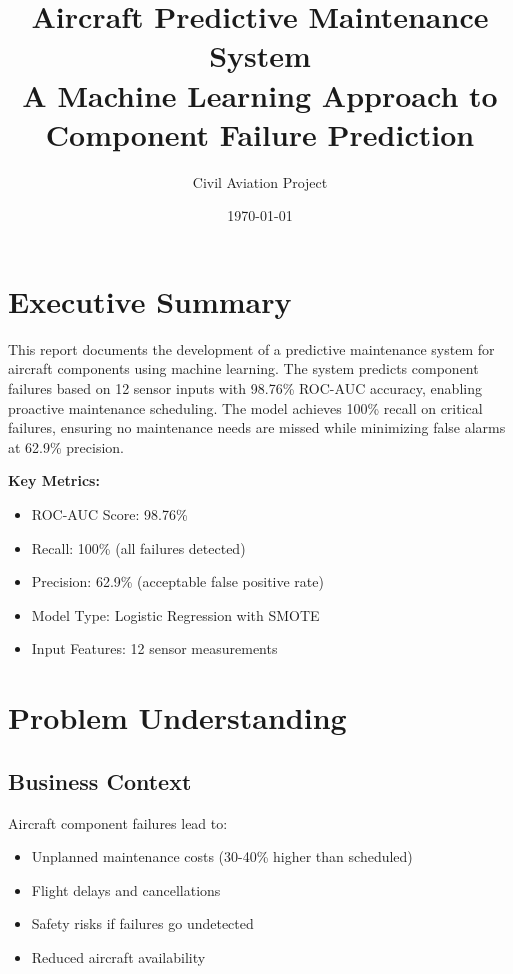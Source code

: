 \documentclass[11pt,a4paper]{article}
\title{\textbf{Aircraft Predictive Maintenance System}\\
\large A Machine Learning Approach to Component Failure Prediction}
\author{Civil Aviation Project}
\date{\today}
\begin{document}
\maketitle
\tableofcontents
\newpage

\section{Executive Summary}

This report documents the development of a predictive maintenance system for aircraft components using machine learning. The system predicts component failures based on 12 sensor inputs with 98.76\% ROC-AUC accuracy, enabling proactive maintenance scheduling. The model achieves 100\% recall on critical failures, ensuring no maintenance needs are missed while minimizing false alarms at 62.9\% precision.

\textbf{Key Metrics:}
\begin{itemize}
    \item ROC-AUC Score: 98.76\%
    \item Recall: 100\% (all failures detected)
    \item Precision: 62.9\% (acceptable false positive rate)
    \item Model Type: Logistic Regression with SMOTE
    \item Input Features: 12 sensor measurements
\end{itemize}

\section{Problem Understanding}

\subsection{Business Context}
Aircraft component failures lead to:
\begin{itemize}
    \item Unplanned maintenance costs (30-40\% higher than scheduled)
    \item Flight delays and cancellations
    \item Safety risks if failures go undetected
    \item Reduced aircraft availability
\end{itemize}
\end{document}
